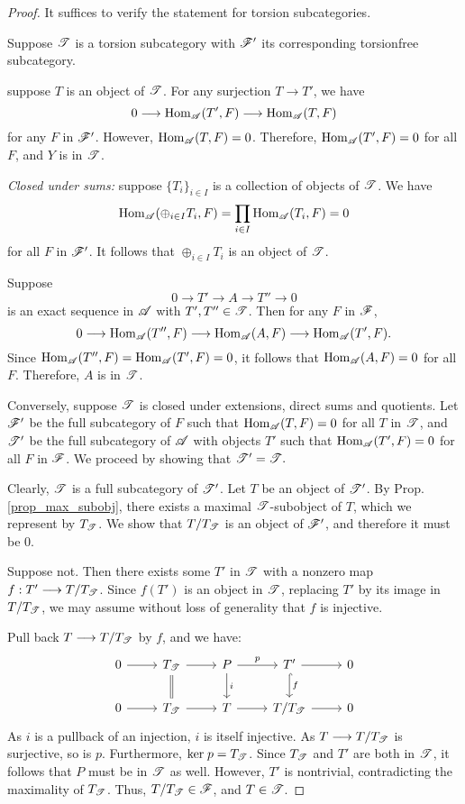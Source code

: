 \begin{proof}
It suffices to verify the statement for torsion subcategories.

Suppose $\mathscr{T}$ is a torsion subcategory with $\mathscr{F}'$ its 
corresponding torsionfree subcategory. 

 suppose $T$ is an object of 
$\mathscr{T}$. For any surjection $T \to T'$, we have 
\[
0 \longrightarrow \mathrm{Hom}_{\mathscr{A}}(T', F) \longrightarrow \mathrm{Hom}_{\mathscr{A}}(T, F)
\]
for any $F$ in $\mathscr{F}'$. However, $\mathrm{Hom}_{\mathscr{A}}(T, F) = 0$.
Therefore, $\mathrm{Hom}_{\mathscr{A}}(T', F) = 0$ for all $F$, and $Y$ is
in $\mathscr{T}$.

\emph{Closed under sums:} suppose $\{T_i\}_{i \in I}$ is a 
collection of objects of $\mathscr{T}$. We have
\[
\mathrm{Hom}_{\mathscr{A}}( \oplus_{i \in I} T_i, F) = \prod_{i \in I}
\mathrm{Hom}_{\mathscr{A}}( T_i, F) = 0
\]
for all $F$ in $\mathscr{F}'$. It follows that $\oplus_{i \in I} T_i$
is an object of $\mathscr{T}$.

 Suppose 
\[
0 \to T' \to A \to T'' \to 0
\]
is an exact sequence in $\mathscr{A}$ with $T', T'' \in \mathscr{T}$.
Then for any $F$ in $\mathscr{F}$, 
\[
0 \longrightarrow \mathrm{Hom}_{\mathscr{A}}(T'', F) \longrightarrow \mathrm{Hom}_{\mathscr{A}}(A, F) \longrightarrow
\mathrm{Hom}_{\mathscr{A}}(T', F).
\]
Since $\mathrm{Hom}_{\mathscr{A}}(T'', F) = \mathrm{Hom}_{\mathscr{A}}(T', F) = 0$,
it follows that $\mathrm{Hom}_{\mathscr{A}}(A, F) = 0$ for all $F$. Therefore, 
$A$ is in $\mathscr{T}$.

Conversely, suppose $\mathscr{T}$ is closed under extensions, direct 
sums and quotients. Let $\mathscr{F}'$ be the full subcategory of $F$ 
such that $\mathrm{Hom}_{\mathscr{A}}(T, F) = 0$ for all $T$ in $\mathscr{T}$, and 
$\mathscr{T}'$ be the full subcategory of $\mathscr{A}$ with objects $T'$ 
such that $\mathrm{Hom}_{\mathscr{A}}(T', F) = 0$ for all $F$ in $\mathscr{F}$. We 
proceed by showing that $\mathscr{T'} = \mathscr{T}.$

Clearly, $\mathscr{T}$ is a full subcategory of $\mathscr{T'}$. Let $T$ be
an object of $\mathscr{T'}$. By Prop. \ref{prop_max_subobj}, there 
exists a maximal $\mathscr{T}$-subobject of $T$, which we represent by
$T_{\mathscr{T}}$. We show that $T/T_{\mathscr{T}}$ is an object of 
$\mathscr{F}'$, and therefore it must be 0.

Suppose not. Then there exists some $T'$ in $\mathscr{T}$ with a 
nonzero map $f: T' \longrightarrow T/T_{\mathscr{T}}$. Since $f(T')$ is an object 
in $\mathscr{T}$, replacing $T'$ by its image in $T/T_{\mathscr{T}}$, we 
may assume without loss of generality that $f$ is injective.

Pull back $T \longrightarrow T/T_{\mathscr{T}}$ by $f$, and we have:
\[
\begin{tikzcd}
0 \arrow{r} &
T_{\Cat{T}} \arrow{r}\arrow[equals]{d} &
P \arrow{r}{p} \arrow{d}{i} &
T' \arrow{r} \arrow[hook]{d}{f} &
0 \\
0 \arrow{r} &
T_{\Cat{T}} \arrow{r} &
T \arrow{r} &
T/T_{\Cat{T}} \arrow{r} &
0
\end{tikzcd}
\]
As $i$ is a pullback of an injection, $i$ is itself injective.
As $T \longrightarrow T/T_{\mathscr{T}}$ is surjective, so is $p$. Furthermore, 
$\mathrm{ker}\; p = T_{\mathscr{T}}$. Since $T_{\mathscr{T}}$ and $T'$
are both in $\mathscr{T}$, it follows that $P$ must be in $\mathscr{T}$ 
as well. However, $T'$ is nontrivial, contradicting the maximality 
of $T_{\mathscr{T}}$. Thus, $T/T_{\mathscr{T}} \in \mathscr{F}$, and $T \in 
\mathscr{T}$.
\end{proof}


